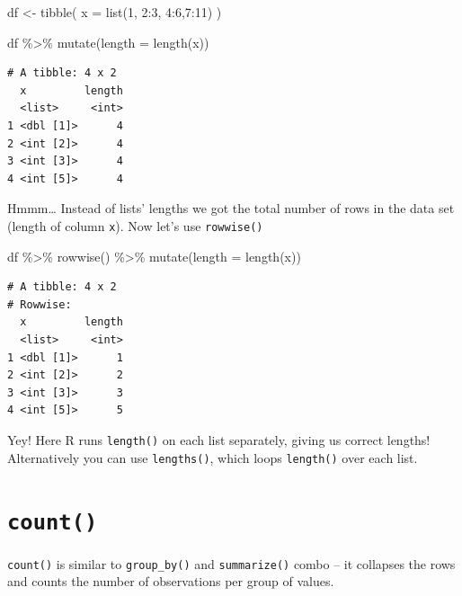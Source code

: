 \documentclass[
  letterpaper,
]{book}
\newenvironment{Shaded}{\begin{snugshade}}{\end{snugshade}}
\newcommand{\AttributeTok}[1]{\textcolor[rgb]{0.40,0.45,0.13}{#1}}
\newcommand{\DecValTok}[1]{\textcolor[rgb]{0.68,0.00,0.00}{#1}}
\newcommand{\FunctionTok}[1]{\textcolor[rgb]{0.28,0.35,0.67}{#1}}
\newcommand{\NormalTok}[1]{\textcolor[rgb]{0.00,0.23,0.31}{#1}}
\newcommand{\OtherTok}[1]{\textcolor[rgb]{0.00,0.23,0.31}{#1}}
\newcommand{\SpecialCharTok}[1]{\textcolor[rgb]{0.37,0.37,0.37}{#1}}
\begin{document}
\begin{Shaded}
\begin{Highlighting}[]
\NormalTok{df }\OtherTok{\textless{}{-}} \FunctionTok{tibble}\NormalTok{(}
  \AttributeTok{x =} \FunctionTok{list}\NormalTok{(}\DecValTok{1}\NormalTok{, }\DecValTok{2}\SpecialCharTok{:}\DecValTok{3}\NormalTok{, }\DecValTok{4}\SpecialCharTok{:}\DecValTok{6}\NormalTok{,}\DecValTok{7}\SpecialCharTok{:}\DecValTok{11}\NormalTok{)}
\NormalTok{)}

\NormalTok{df }\SpecialCharTok{\%\textgreater{}\%} \FunctionTok{mutate}\NormalTok{(}\AttributeTok{length =} \FunctionTok{length}\NormalTok{(x))}
\end{Highlighting}
\end{Shaded}

\begin{verbatim}
# A tibble: 4 x 2
  x         length
  <list>     <int>
1 <dbl [1]>      4
2 <int [2]>      4
3 <int [3]>      4
4 <int [5]>      4
\end{verbatim}

Hmmm\ldots{} Instead of lists' lengths we got the total number of rows
in the data set (length of column \texttt{x}). Now let's use
\texttt{rowwise()}

\begin{Shaded}
\begin{Highlighting}[]
\NormalTok{df }\SpecialCharTok{\%\textgreater{}\%} \FunctionTok{rowwise}\NormalTok{() }\SpecialCharTok{\%\textgreater{}\%}
  \FunctionTok{mutate}\NormalTok{(}\AttributeTok{length =} \FunctionTok{length}\NormalTok{(x))}
\end{Highlighting}
\end{Shaded}

\begin{verbatim}
# A tibble: 4 x 2
# Rowwise: 
  x         length
  <list>     <int>
1 <dbl [1]>      1
2 <int [2]>      2
3 <int [3]>      3
4 <int [5]>      5
\end{verbatim}

Yey! Here R runs \texttt{length()} on each list separately, giving us
correct lengths! Alternatively you can use \texttt{lengths()}, which
loops \texttt{length()} over each list.

\hypertarget{count}{%
\section{\texorpdfstring{\texttt{count()}}{count()}}\label{count}}

\texttt{count()} is similar to \texttt{group\_by()} and
\texttt{summarize()} combo -- it collapses the rows and counts the
number of observations per group of values.
\end{document}
